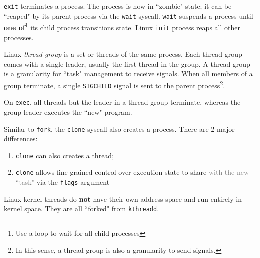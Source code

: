 \verb|exit| terminates a process. The process is now in ``zombie" state; it can be ``reaped" by its parent process via the \verb|wait| syscall. \verb|wait| suspends a process until \textbf{one of}\footnote{Use a loop to wait for all child processes} its child process transitions state. Linux \verb|init| process reaps all other processes.

Linux \textit{thread group} is a set or threads of the same process. Each thread group comes with a single leader, usually the first thread in the group. A thread group is a granularity for ``task" management to receive signals. When all members of a group terminate, a single \verb|SIGCHILD| signal is sent to the parent process\footnote{In this sense, a thread group is also a granularity to send signals.}.

On \verb|exec|, all threads but the leader in a thread group terminate, whereas the group leader executes the ``new" program.


Similar to \verb|fork|, the \verb|clone| syscall also creates a process. There are 2 major differences:

\begin{enumerate}
    \item \verb|clone| can also creates a thread;
    \item \verb|clone| allows fine-grained control over execution state to share \textcolor{gray}{with the new ``task"} via the \verb|flags| argument
\end{enumerate}

Linux kernel threads do \textbf{not} have their own address space and run entirely in kernel space. They are all ``forked" from \verb|kthreadd|.
